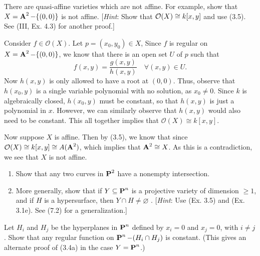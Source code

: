 \documentclass[10pt]{amsart}
\begin{document}
\begin{exercise}[3.6]
    There are quasi-affine varieties which are not affine. For example, show that 
    $X = \aa^2 - \{(0,0)\}$ is not affine. [\emph{Hint}: Show 
    that $\cO(X) \cong k[x,y]$
    and use (3.5). See (III, Ex. 4.3) for another proof.]
\end{exercise}

\begin{solution}
    \begin{luke}
        Consider $f \in \mathcal{O}(X)$. Let $p = (x_0, y_0) \in X$,
    Since $f$ is regular on $X = \aa^2 - \{(0,0)\}$, 
    we know that there is an open set $U$ of $p$ such that 
    \[
        f(x, y) = \frac{g(x,y)}{h(x,y)} \quad \forall (x,y) \in U.
    \]
    Now $h(x,y)$ is only allowed to have a root at $(0,0)$. 
    Thus, observe that $h(x_0, y)$ is a single variable polynomial with no solution, as 
    $x_0 \ne 0$. Since $k$ is algebraically closed, $h(x_0, y)$ must be constant, 
    so that $h(x, y)$ is just a polynomial in $x$. However, we can similarly 
    observe that $h(x,y)$ would also need to be constant. This all together 
    implies that $\mathcal{O}(X) \cong k[x, y]$.
    
    Now suppose $X$ is affine. Then by (3.5), we know that since 
    $\mathcal{O}(X) \cong k[x,y] \cong A(\aa^2)$, which implies that 
    $\aa^2 \cong X$. As this is a contradiction, we see that $X$ is not affine.
    \end{luke}

\end{solution}


\begin{exercise}[3.7]  
    \begin{enumerate}[itemsep=1pt]
        \item Show that any two curves in $\pp^2$ have a nonempty intersection.
        \item More generally, show that if $Y \subseteq \pp^n$ is a projective variety of 
        dimension $\ge 1$, and if $H$ is a hypersurface, then $Y \cap H \ne \varnothing$ . 
        [\emph{Hint}: Use (Ex. 3.5) and (Ex. 3.1e). See (7.2) for a generalization.]
    \end{enumerate}
\end{exercise}




\begin{exercise}[3.8]
    Let $H_i$ and $H_j$ be the hyperplanes in $\pp^n$ defined by 
    $x_i = 0$ and $x_j = 0$, with $i \ne j$. Show that any regular function on 
    $\pp^n - (H_i \cap H_j)$ is constant. 
    (This gives an alternate proof of (3.4a) in the case $Y = \pp^n$.)
\end{exercise}
\end{document}

